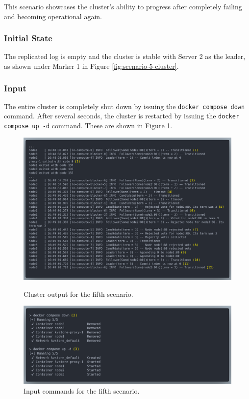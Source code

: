 This scenario showcases the cluster's ability to progress after completely failing and becoming operational again.

\subsubsection{Initial State}

The replicated log is empty and the cluster is stable with Server 2 as the leader, as shown under Marker 1 in Figure \ref{fig:scenario-5-cluster}.

\subsubsection{Input}

The entire cluster is completely shut down by issuing the \lstinline|docker compose down| command. After several seconds, the cluster is restarted by issuing the \lstinline|docker compose up -d| command. These are shown in Figure \ref{fig:scenario-5-commands}.

\begin{figure}[!ht]
\centering
\includegraphics[width=500pt]{images/scenario_5_cluster.png}
\caption{Cluster output for the fifth scenario.}
\label{fig:scenario-5-cluster}
\includegraphics[width=500pt]{images/scenario_5_commands.png}
\caption{Input commands for the fifth scenario.}
\label{fig:scenario-5-commands}
\end{figure}

